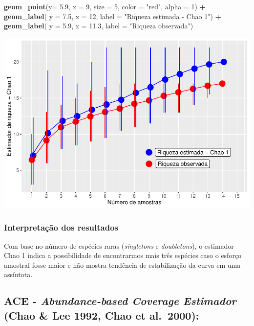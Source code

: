 \documentclass[
]{book}
\newenvironment{Shaded}{\begin{snugshade}}{\end{snugshade}}
\newcommand{\DataTypeTok}[1]{\textcolor[rgb]{0.13,0.29,0.53}{#1}}
\newcommand{\DecValTok}[1]{\textcolor[rgb]{0.00,0.00,0.81}{#1}}
\newcommand{\FloatTok}[1]{\textcolor[rgb]{0.00,0.00,0.81}{#1}}
\newcommand{\KeywordTok}[1]{\textcolor[rgb]{0.13,0.29,0.53}{\textbf{#1}}}
\newcommand{\NormalTok}[1]{#1}
\newcommand{\OperatorTok}[1]{\textcolor[rgb]{0.81,0.36,0.00}{\textbf{#1}}}
\newcommand{\StringTok}[1]{\textcolor[rgb]{0.31,0.60,0.02}{#1}}
\begin{document}
\begin{Shaded}
\begin{Highlighting}[]
\StringTok{  }\KeywordTok{geom_point}\NormalTok{(}\DataTypeTok{y=} \FloatTok{5.9}\NormalTok{, }\DataTypeTok{x =} \DecValTok{9}\NormalTok{, }\DataTypeTok{size =} \DecValTok{5}\NormalTok{, }\DataTypeTok{color =} \StringTok{"red"}\NormalTok{, }\DataTypeTok{alpha =} \DecValTok{1}\NormalTok{) }\OperatorTok{+}\StringTok{ }
\StringTok{  }\KeywordTok{geom_label}\NormalTok{( }\DataTypeTok{y =} \FloatTok{7.5}\NormalTok{, }\DataTypeTok{x =} \DecValTok{12}\NormalTok{, }\DataTypeTok{label =} \StringTok{"Riqueza estimada - Chao 1"}\NormalTok{) }\OperatorTok{+}
\StringTok{  }\KeywordTok{geom_label}\NormalTok{( }\DataTypeTok{y =} \FloatTok{5.9}\NormalTok{, }\DataTypeTok{x =} \FloatTok{11.3}\NormalTok{, }\DataTypeTok{label =} \StringTok{"Riqueza observada"}\NormalTok{)}
\end{Highlighting}
\end{Shaded}

\includegraphics{livro_r_ecologia_files/figure-latex/unnamed-chunk-44-1.pdf}

\hypertarget{interpretauxe7uxe3o-dos-resultados}{%
\subsubsection{Interpretação dos resultados}\label{interpretauxe7uxe3o-dos-resultados}}

Com base no número de espécies raras (\emph{singletons} e \emph{doubletons}), o estimador Chao 1 indica a possibilidade de encontrarmos mais três espécies caso o esforço amostral fosse maior e não mostra tendência de estabilização da curva em uma assíntota.

\hypertarget{ace---abundance-based-coverage-estimador-chao-lee-1992-chao-et-al.-2000}{%
\subsection{\texorpdfstring{ACE - \emph{Abundance-based Coverage Estimador} (Chao \& Lee 1992, Chao et al.~2000):}{ACE - Abundance-based Coverage Estimador (Chao \& Lee 1992, Chao et al.~2000):}}\label{ace---abundance-based-coverage-estimador-chao-lee-1992-chao-et-al.-2000}}
\end{document}
